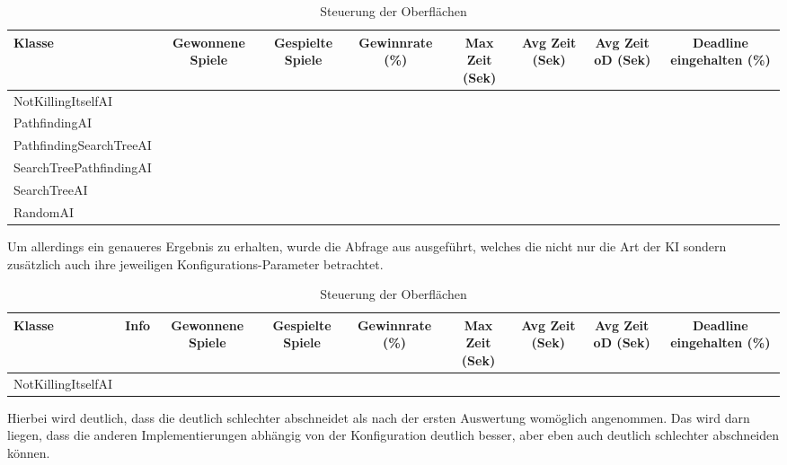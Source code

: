 \begin{table}[htb]
    \centering
    \begin{tabular}{|l|c|c|c|c|c|c|c|}
        \hline
		\textbf{Klasse} & {\textbf{Gewonnene Spiele}} & \textbf{Gespielte Spiele} & \textbf{Gewinnrate (\%)} & \textbf{Max Zeit (Sek)} & \textbf{Avg Zeit (Sek)} & \textbf{Avg Zeit oD (Sek)} & \textbf{Deadline eingehalten (\%)} \\ \hline
        NotKillingItselfAI &  &  &  &  &  &  &  \\ \hline
        PathfindingAI &  &  &  &  &  &  &  \\ \hline
		PathfindingSearchTreeAI &  &  &  &  &  &  &  \\ \hline
		SearchTreePathfindingAI &  &  &  &  &  &  &  \\ \hline
		SearchTreeAI &  &  &  &  &  &  &  \\ \hline
		RandomAI &  &  &  &  &  &  &  \\ \hline
    \end{tabular}
    \caption{Steuerung der Oberflächen}
    \label{tab:evaluation-ki-klasse}
\end{table}

Um allerdings ein genaueres Ergebnis zu erhalten, wurde die Abfrage aus  ausgeführt, welches die
nicht nur die Art der \ac{KI} sondern zusätzlich auch ihre jeweiligen Konfigurations-Parameter betrachtet.

\begin{table}[htb]
    \centering
    \begin{tabular}{|l|c|c|c|c|c|c|c|c|}
        \hline
		\textbf{Klasse} & \textbf{Info} & {\textbf{Gewonnene Spiele}} & \textbf{Gespielte Spiele} & \textbf{Gewinnrate (\%)} & \textbf{Max Zeit (Sek)} & \textbf{Avg Zeit (Sek)} & \textbf{Avg Zeit oD (Sek)} & \textbf{Deadline eingehalten (\%)} \\ \hline
        NotKillingItselfAI &  &  &  &  &  &  &  &  \\ \hline
    \end{tabular}
    \caption{Steuerung der Oberflächen}
    \label{tab:evaluation-ki-konfiguration}
\end{table}

Hierbei wird deutlich, dass die  deutlich schlechter abschneidet als nach der ersten Auswertung
womöglich angenommen.
Das wird darn liegen, dass die anderen Implementierungen abhängig von der Konfiguration deutlich besser, aber eben auch
deutlich schlechter abschneiden können.

